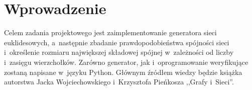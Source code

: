 
\chapter{Wprowadzenie}
	\label{wprowadzenie}

	Celem zadania projektowego jest zaimplementowanie generatora sieci euklidesowych, a~następnie zbadanie prawdopodobieństwa spójności sieci i~określenie rozmiaru największej składowej spójnej w~zależności od liczby i~zasięgu wierzchołków. Zarówno generator, jak i~oprogramowanie weryfikujące zostaną napisane w~języku Python. Głównym źródłem wiedzy będzie książka autorstwa Jacka Wojciechowskiego i~Krzysztofa Pieńkosza ,,Grafy i~Sieci''.\cite{WojciechowskiJacek2013Gis}
